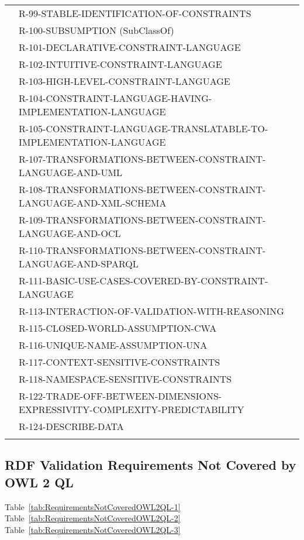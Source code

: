 \documentclass{llncs}
\newcommand{\hr}{\hline\noalign{\smallskip}} %
\begin{document}
\begin{table}
\begin{tabular}{ll}
& R-99-STABLE-IDENTIFICATION-OF-CONSTRAINTS \\
& R-100-SUBSUMPTION (SubClassOf) \\
& R-101-DECLARATIVE-CONSTRAINT-LANGUAGE \\
& R-102-INTUITIVE-CONSTRAINT-LANGUAGE \\
& R-103-HIGH-LEVEL-CONSTRAINT-LANGUAGE \\
& R-104-CONSTRAINT-LANGUAGE-HAVING-IMPLEMENTATION-LANGUAGE \\
& R-105-CONSTRAINT-LANGUAGE-TRANSLATABLE-TO-IMPLEMENTATION-LANGUAGE \\
& R-107-TRANSFORMATIONS-BETWEEN-CONSTRAINT-LANGUAGE-AND-UML \\
& R-108-TRANSFORMATIONS-BETWEEN-CONSTRAINT-LANGUAGE-AND-XML-SCHEMA \\
& R-109-TRANSFORMATIONS-BETWEEN-CONSTRAINT-LANGUAGE-AND-OCL \\
& R-110-TRANSFORMATIONS-BETWEEN-CONSTRAINT-LANGUAGE-AND-SPARQL \\
& R-111-BASIC-USE-CASES-COVERED-BY-CONSTRAINT-LANGUAGE \\
& R-113-INTERACTION-OF-VALIDATION-WITH-REASONING \\
& R-115-CLOSED-WORLD-ASSUMPTION-CWA \\
& R-116-UNIQUE-NAME-ASSUMPTION-UNA \\
& R-117-CONTEXT-SENSITIVE-CONSTRAINTS \\
& R-118-NAMESPACE-SENSITIVE-CONSTRAINTS \\
& R-122-TRADE-OFF-BETWEEN-DIMENSIONS-EXPRESSIVITY-COMPLEXITY-PREDICTABILITY \\
& R-124-DESCRIBE-DATA \\
\hr
\end{tabular}
\end{table}

\subsection{RDF Validation Requirements Not Covered by OWL 2 QL}

Table~\ref{tab:RequirementsNotCoveredOWL2QL-1}
Table~\ref{tab:RequirementsNotCoveredOWL2QL-2}
Table~\ref{tab:RequirementsNotCoveredOWL2QL-3}
\end{document}
